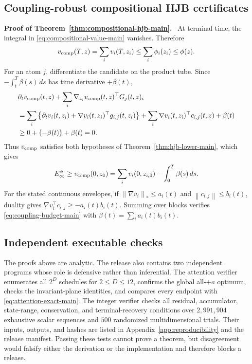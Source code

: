 \documentclass[twoside,11pt]{article}
\renewenvironment{proof}[1][Proof]{\par\noindent\textbf{#1.}\ }{\hfill\BlackBox\par\medskip}
\newcommand{\norm}[1]{\left\lVert #1\right\rVert}
\begin{document}
\subsection{Coupling-robust compositional HJB certificates}
\label{app:compositional-hjb-proof}

\begin{proof}[Proof of Theorem~\ref{thm:compositional-hjb-main}]
At terminal time, the integral in
\eqref{eq:compositional-value-main} vanishes.  Therefore
\begin{equation}
 v_{\rm comp}(T,z)
 =\sum_i v_i(T,z_i)
 \le\sum_i\phi_i(z_i)
 \le\phi(z).
 \label{eq:app-comp-terminal}
\end{equation}
For an atom $j$, differentiate the candidate on the product tube.  Since
$-\int_t^T\beta(s)\,ds$ has time derivative $+\beta(t)$,
\begin{align}
 &\partial_tv_{\rm comp}(t,z)
 +\sum_i\nabla_{z_i}v_{\rm comp}(t,z)^\top G_j(t,z)_i\nonumber\\
 &=\sum_i\left\{\partial_tv_i(t,z_i)
     +\nabla v_i(t,z_i)^\top g_{i,j}(t,z_i)\right\}
   +\sum_i\nabla v_i(t,z_i)^\top c_{i,j}(t,z)
   +\beta(t)\nonumber\\
 &\ge0+\{-\beta(t)\}+\beta(t)=0.
 \label{eq:app-comp-hjb}
\end{align}
Thus $v_{\rm comp}$ satisfies both hypotheses of
Theorem~\ref{thm:hjb-lower-main}, which gives
\begin{equation}
 E_\infty^\phi\ge v_{\rm comp}(0,z_0)
 =\sum_i v_i(0,z_{i,0})-\int_0^T\beta(s)\,ds.
 \label{eq:app-comp-value}
\end{equation}
For the stated continuous envelopes, if $\norm{\nabla v_i}_*\le a_i(t)$ and
$\norm{c_{i,j}}\le b_i(t)$, duality gives
$\nabla v_i^\top c_{i,j}\ge-a_i(t)b_i(t)$.  Summing over blocks verifies
\eqref{eq:coupling-budget-main} with
$\beta(t)=\sum_i a_i(t)b_i(t)$.
\end{proof}

\subsection{Independent executable checks}
\label{app:new-theory-verification}

The proofs above are analytic.  The release also contains two independent
programs whose role is defensive rather than inferential.  The attention
verifier enumerates all $2^D$ schedules for $2\le D\le12$, confirms the global
all-$+a$ optimum, checks the invariant-plane identities, and compares every
endpoint with \eqref{eq:attention-exact-main}.  The integer verifier checks
all residual, accumulator, state-range, conservation, and terminal-recovery
conditions over $2{,}991{,}904$ exhaustive scalar sequences and $500$
randomized multidimensional trials.  Their inputs, outputs, and hashes are
listed in Appendix~\ref{app:reproducibility} and the release
manifest.  Passing these tests cannot prove a theorem, but disagreement would
falsify either the derivation or the implementation and therefore blocks a
release.
\end{document}
